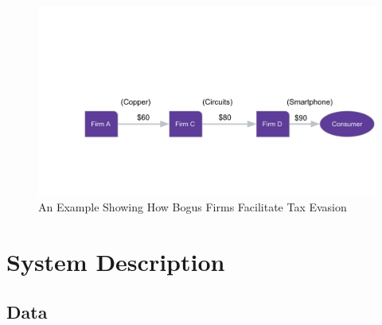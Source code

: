 \begin{figure}[t!]
  \includegraphics[width=1\textwidth,page=4]{graphs/StylizedExample_New2.pdf}
  \caption{An Example Showing How Bogus Firms Facilitate Tax Evasion}
  \label{fig:bogus-mechanism2}
\end{figure}

\section{System Description}
\label{sec:system-description}
\subsection{Data}
\label{subsec:2-data} 

